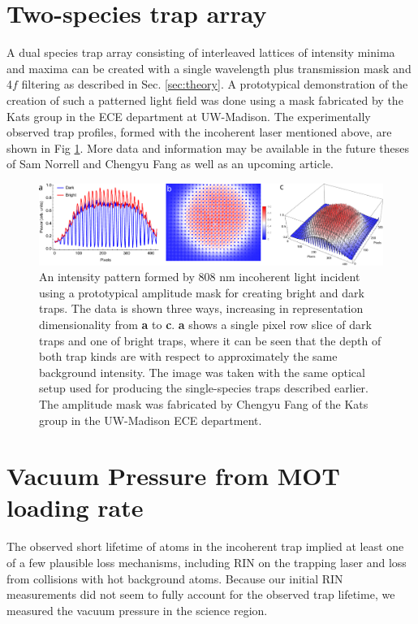 \section{Two-species trap array}


A dual species trap array consisting of interleaved lattices of intensity minima and maxima can be created with a single wavelength plus transmission mask and 4$f$ filtering as described in Sec. \ref{sec:theory}. A prototypical demonstration of the creation of such a patterned light field was done using a mask fabricated by the Kats group in the ECE department at UW-Madison. The experimentally observed trap profiles, formed with the incoherent laser mentioned above, are shown in Fig \ref{fig:dual_species_traps}. More data and information may be available in the future theses of Sam Norrell and Chengyu Fang as well as an upcoming article\cite{fang2024interspersed}.

\begin{figure}
    \centering
    \includegraphics[width=\textwidth]{Images/first_dual_species_trap_image.pdf}
    \caption{An intensity pattern formed by 808 nm incoherent light incident using a prototypical amplitude mask for creating bright and dark traps. The data is shown three ways, increasing in representation dimensionality from \textbf{a} to \textbf{c}. \textbf{a} shows a single pixel row slice of dark traps and one of bright traps, where it can be seen that the depth of both trap kinds are with respect to approximately the same background intensity. The image was taken with the same optical setup used for producing the single-species traps described earlier. The amplitude mask was fabricated by Chengyu Fang of the Kats group in the UW-Madison ECE department.}
    \label{fig:dual_species_traps}
\end{figure}

\section{Vacuum Pressure from MOT loading rate}

The observed short lifetime of atoms in the incoherent trap implied at least one of a few plausible loss mechanisms, including RIN on the trapping laser and loss from collisions with hot background atoms. Because our initial RIN measurements did not seem to fully account for the observed trap lifetime, we measured the vacuum pressure in the science region. 

